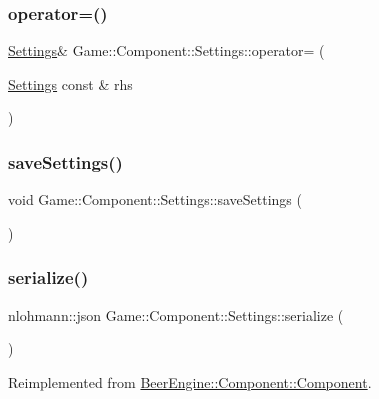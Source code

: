 \subsubsection{\texorpdfstring{operator=()}{operator=()}}
{\footnotesize\ttfamily \mbox{\hyperlink{class_game_1_1_component_1_1_settings}{Settings}}\& Game\+::\+Component\+::\+Settings\+::operator= (\begin{DoxyParamCaption}\item[{\mbox{\hyperlink{class_game_1_1_component_1_1_settings}{Settings}} const \&}]{rhs }\end{DoxyParamCaption})}

\mbox{\label{class_game_1_1_component_1_1_settings_ad8883dfb4a2ae8a041e293e73c7a6dc5}} 
\subsubsection{\texorpdfstring{save\+Settings()}{saveSettings()}}
{\footnotesize\ttfamily void Game\+::\+Component\+::\+Settings\+::save\+Settings (\begin{DoxyParamCaption}{ }\end{DoxyParamCaption})}

\mbox{\label{class_game_1_1_component_1_1_settings_a1e378dbe2c0c7a198eae234e5979e91f}} 
\subsubsection{\texorpdfstring{serialize()}{serialize()}}
{\footnotesize\ttfamily nlohmann\+::json Game\+::\+Component\+::\+Settings\+::serialize (\begin{DoxyParamCaption}{ }\end{DoxyParamCaption})\hspace{0.3cm}{\ttfamily [virtual]}}



Reimplemented from \mbox{\hyperlink{class_beer_engine_1_1_component_1_1_component_a4d82d8a6b22b93514e0585fa4073041f}{Beer\+Engine\+::\+Component\+::\+Component}}.

